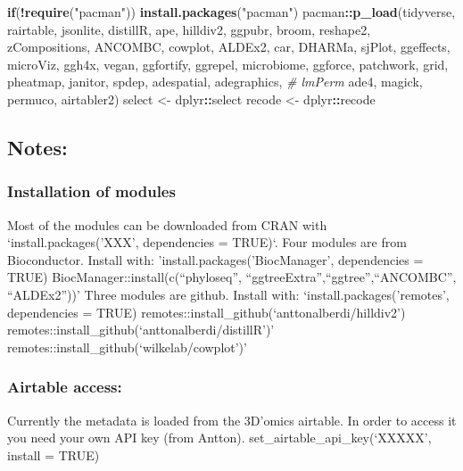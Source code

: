 \documentclass[
]{book}
\newenvironment{Shaded}{\begin{snugshade}}{\end{snugshade}}
\newcommand{\CommentTok}[1]{\textcolor[rgb]{0.56,0.35,0.01}{\textit{#1}}}
\newcommand{\ControlFlowTok}[1]{\textcolor[rgb]{0.13,0.29,0.53}{\textbf{#1}}}
\newcommand{\FunctionTok}[1]{\textcolor[rgb]{0.13,0.29,0.53}{\textbf{#1}}}
\newcommand{\NormalTok}[1]{#1}
\newcommand{\OtherTok}[1]{\textcolor[rgb]{0.56,0.35,0.01}{#1}}
\newcommand{\SpecialCharTok}[1]{\textcolor[rgb]{0.81,0.36,0.00}{\textbf{#1}}}
\newcommand{\StringTok}[1]{\textcolor[rgb]{0.31,0.60,0.02}{#1}}
\begin{document}
\begin{Shaded}
\begin{Highlighting}[]
\ControlFlowTok{if}\NormalTok{(}\SpecialCharTok{!}\FunctionTok{require}\NormalTok{(}\StringTok{"pacman"}\NormalTok{)) }\FunctionTok{install.packages}\NormalTok{(}\StringTok{"pacman"}\NormalTok{)}
\NormalTok{pacman}\SpecialCharTok{::}\FunctionTok{p\_load}\NormalTok{(tidyverse, rairtable, jsonlite, distillR, ape,}
\NormalTok{               hilldiv2, ggpubr, broom, reshape2, zCompositions, ANCOMBC,}
\NormalTok{               cowplot, ALDEx2, car, DHARMa, sjPlot, ggeffects, microViz,}
\NormalTok{               ggh4x, vegan, ggfortify, ggrepel, microbiome, ggforce, patchwork,}
\NormalTok{               grid, pheatmap, janitor, spdep, adespatial, adegraphics, }\CommentTok{\# lmPerm}
\NormalTok{               ade4, magick, permuco, airtabler2)}
\NormalTok{select }\OtherTok{\textless{}{-}}\NormalTok{ dplyr}\SpecialCharTok{::}\NormalTok{select}
\NormalTok{recode }\OtherTok{\textless{}{-}}\NormalTok{ dplyr}\SpecialCharTok{::}\NormalTok{recode}
\end{Highlighting}
\end{Shaded}

\subsection{Notes:}\label{notes}

\subsubsection{Installation of modules}\label{installation-of-modules}

Most of the modules can be downloaded from CRAN with `install.packages('XXX', dependencies = TRUE)`.
Four modules are from Bioconductor.
Install with: 'install.packages('BiocManager', dependencies = TRUE)
BiocManager::install(c(``phyloseq'', ``ggtreeExtra'',``ggtree'',``ANCOMBC'', ``ALDEx2''))'
Three modules are github.
Install with: `install.packages('remotes', dependencies = TRUE)
remotes::install\_github(`anttonalberdi/hilldiv2')
remotes::install\_github(`anttonalberdi/distillR')'
remotes::install\_github(`wilkelab/cowplot')'

\subsubsection{Airtable access:}\label{airtable-access}

Currently the metadata is loaded from the 3D'omics airtable. In order to access it you need your own API key (from Antton). set\_airtable\_api\_key(`XXXXX', install = TRUE)

  
\end{document}
